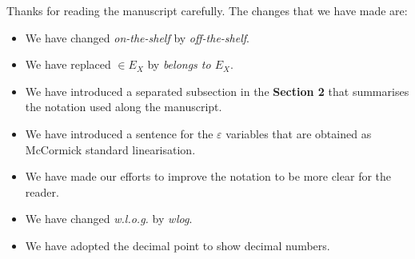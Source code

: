 \documentclass{article}
\newenvironment{reviewer}{\setcounter{pointcounter}{1}}{}
\newcommand{\point}{\text{{\selectfont \thepointcounter} \stepcounter{pointcounter}}}
\begin{document}
\begin{reviewer}
		\begin{tcolorbox}[breakable,enhanced,coltitle=black,colback=green!5!white,colframe=green!75!black,title=\textbf{Answer R2.\point},borderline={1pt}{0pt}{black},boxrule=0pt]
			Thanks for reading the manuscript carefully. The changes that we have made are:
			\begin{itemize}
				\item We have changed \textit{on-the-shelf} by \textit{off-the-shelf}.
				\item We have replaced $\in E_X$ by \textit{belongs to $E_X$}.
				\item We have introduced a separated subsection in the \textbf{Section 2} that summarises the notation used along the manuscript.
				\item We have introduced a sentence for the $\varepsilon$ variables that are obtained as McCormick standard linearisation.
				\item We have made our efforts to improve the notation to be more clear for the reader.
				\item We have changed \textit{w.l.o.g.} by \textit{wlog}.
				\item We have adopted the decimal point to show decimal numbers.
			\end{itemize}
		\end{tcolorbox}
	\end{reviewer}
	
%	
%	
	
	
\end{document}
